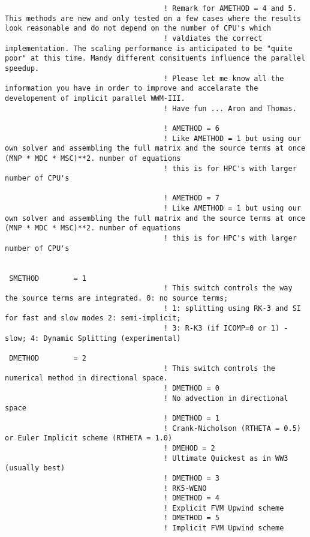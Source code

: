 \documentclass[12pt]{amsart}
\begin{document}
\begin{verbatim}
                                     ! Remark for AMETHOD = 4 and 5. This methods are new and only tested on a few cases where the results look reasonable and do not depend on the number of CPU's which
                                     ! valdiates the correct implementation. The scaling performance is anticipated to be "quite poor" at this time. Mandy different consituents influence the parallel speedup.
                                     ! Please let me know all the information you have in order to improve and accelarate the developement of implicit parallel WWM-III.
                                     ! Have fun ... Aron and Thomas.

                                     ! AMETHOD = 6 
                                     ! Like AMETHOD = 1 but using our own solver and assembling the full matrix and the source terms at once (MNP * MDC * MSC)**2. number of equations
                                     ! this is for HPC's with larger number of CPU's 

                                     ! AMETHOD = 7 
                                     ! Like AMETHOD = 1 but using our own solver and assembling the full matrix and the source terms at once (MNP * MDC * MSC)**2. number of equations
                                     ! this is for HPC's with larger number of CPU's


 SMETHOD        = 1
                                     ! This switch controls the way the source terms are integrated. 0: no source terms;
                                     ! 1: splitting using RK-3 and SI for fast and slow modes 2: semi-implicit;
                                     ! 3: R-K3 (if ICOMP=0 or 1) - slow; 4: Dynamic Splitting (experimental)

 DMETHOD        = 2
                                     ! This switch controls the numerical method in directional space.
                                     ! DMETHOD = 0
                                     ! No advection in directional space
                                     ! DMETHOD = 1
                                     ! Crank-Nicholson (RTHETA = 0.5) or Euler Implicit scheme (RTHETA = 1.0)
                                     ! DMEHOD = 2
                                     ! Ultimate Quickest as in WW3 (usually best)
                                     ! DMETHOD = 3
                                     ! RK5-WENO
                                     ! DMETHOD = 4
                                     ! Explicit FVM Upwind scheme
                                     ! DMETHOD = 5
                                     ! Implicit FVM Upwind scheme


\end{verbatim}
\end{document}
